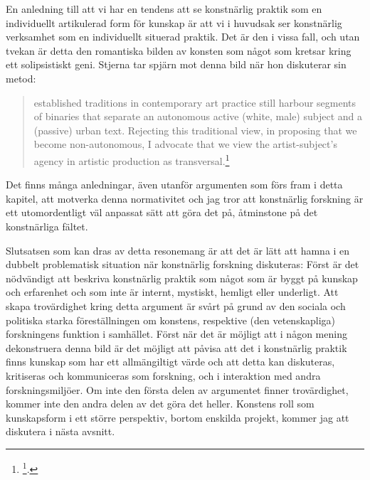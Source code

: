 \documentclass[11pt]{article}
\begin{document}
En anledning till att vi har en tendens att se konstnärlig praktik som
en individuellt artikulerad form för kunskap är att vi i huvudsak ser
konstnärlig verksamhet som en individuellt situerad praktik. Det är den
i vissa fall, och utan tvekan är detta den romantiska bilden av konsten
som något som kretsar kring ett solipsistiskt geni. Stjerna tar spjärn
mot denna bild när hon diskuterar sin metod:

\begin{quote}
established traditions in contemporary art practice still harbour
segments of binaries that separate an autonomous active (white, male)
subject and a (passive) urban text. Rejecting this traditional view,
in proposing that we become non-autonomous, I advocate that we view
the artist-subject's agency in artistic production as
transversal.\footnote{\footcite[s.119-20]{Stjerna2018}.}
\end{quote}

Det finns många anledningar, även utanför argumenten som förs fram i
detta kapitel, att motverka denna normativitet och jag tror att
konstnärlig forskning är ett utomordentligt väl anpassat sätt att göra
det på, åtminstone på det konstnärliga fältet.

Slutsatsen som kan dras av detta resonemang är att det är lätt att hamna
i en dubbelt problematisk situation när konstnärlig forskning
diskuteras: Först är det nödvändigt att beskriva konstnärlig praktik som
något som är byggt på kunskap och erfarenhet och som inte är internt,
mystiskt, hemligt eller underligt. Att skapa trovärdighet kring detta
argument är svårt på grund av den sociala och politiska starka
föreställningen om konstens, respektive (den vetenskapliga) forskningens
funktion i samhället. Först när det är möjligt att i någon mening
dekonstruera denna bild är det möjligt att påvisa att det i konstnärlig
praktik finns kunskap som har ett allmängiltigt värde och att detta kan
diskuteras, kritiseras och kommuniceras som forskning, och i interaktion
med andra forskningsmiljöer. Om inte den första delen av argumentet
finner trovärdighet, kommer inte den andra delen av det göra det heller.
Konstens roll som kunskapsform i ett större perspektiv, bortom enskilda
projekt, kommer jag att diskutera i nästa avsnitt.
\end{document}
